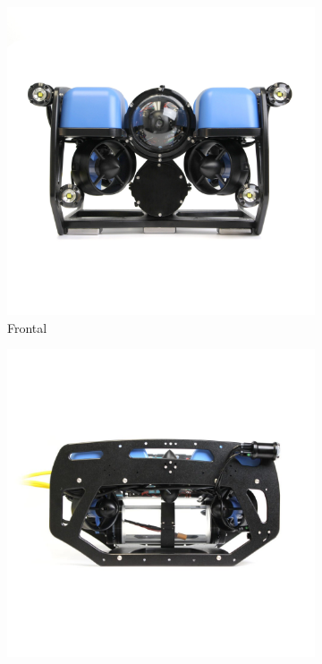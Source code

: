 \documentclass[../main.tex]{subfiles}
\begin{document}
\begin{figure}[H]
  \centering
  \caption{Vistas do robô BlueROV.}
  
  \begin{subfigure}{0.2\textwidth}
    \centering
    \includegraphics[width=\textwidth]{images/frontal_bluerov.jpg}
    \caption{Frontal}
    \label{fig:rov_front}
  \end{subfigure}\hspace{0.5em}%
  \begin{subfigure}{0.2\textwidth}
    \centering
    \includegraphics[width=\textwidth]{images/lateral_bluerov.jpg}

\end{subfigure}
\end{figure}
\end{document}
